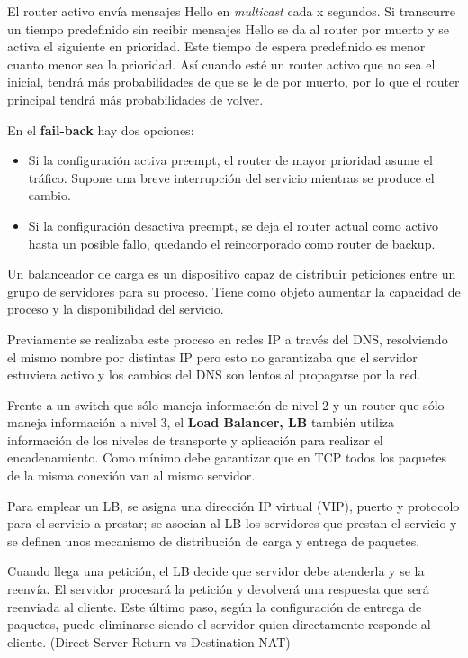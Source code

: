 \documentclass{apuntes}[nochap]
\begin{document}
El router activo envía mensajes Hello en \textit{multicast} cada x segundos. Si transcurre un tiempo predefinido sin recibir mensajes Hello se da al router por muerto y se activa el siguiente en prioridad. Este tiempo de espera predefinido es menor cuanto menor sea la prioridad. Así cuando esté un router activo que no sea el inicial, tendrá más probabilidades de que se le de por muerto, por lo que el router principal tendrá más probabilidades de volver.

En el \textbf{fail-back} hay dos opciones:
\begin{itemize}
\item Si la configuración activa preempt, el router de mayor prioridad asume el tráfico. Supone una breve interrupción del servicio mientras se produce el cambio.
\item Si la configuración desactiva preempt, se deja el router actual como activo hasta un posible fallo, quedando el reincorporado como router de backup.
\end{itemize}

\begin{defn}
Un balanceador de carga es un dispositivo capaz de distribuir peticiones entre un grupo de servidores para su proceso. Tiene como objeto aumentar la capacidad de proceso y la disponibilidad del servicio.

Previamente se realizaba este proceso en redes IP a través del DNS, resolviendo el mismo nombre por distintas IP pero esto no garantizaba que el servidor estuviera activo y los cambios del DNS son lentos al propagarse por la red.

Frente a un switch que sólo maneja información de nivel 2 y un router que sólo maneja información a nivel 3, el \textbf{Load Balancer, LB} también utiliza información de los niveles de transporte y aplicación para realizar el encadenamiento. Como mínimo debe garantizar que en TCP todos los paquetes de la misma conexión van al mismo servidor.
\end{defn}

Para emplear un LB, se asigna una dirección IP virtual (VIP), puerto y protocolo para el servicio a prestar; se asocian al LB los servidores que prestan el servicio y se definen unos mecanismo de distribución de carga y entrega de paquetes.

Cuando llega una petición, el LB decide que servidor debe atenderla y se la reenvía. El servidor procesará la petición y devolverá una respuesta que será reenviada al cliente. Este último paso, según la configuración de entrega de paquetes, puede eliminarse siendo el servidor quien directamente responde al cliente. (Direct Server Return vs Destination NAT)
\end{document}
